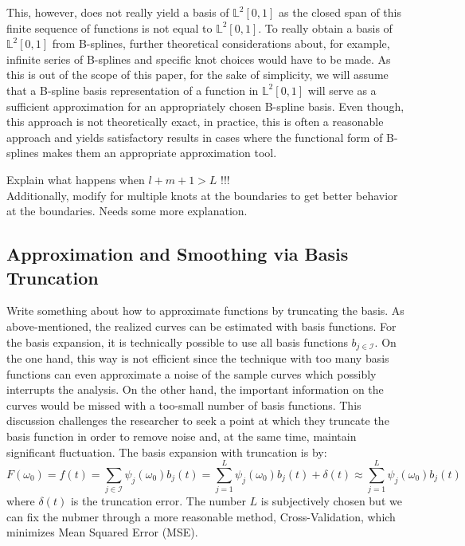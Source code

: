 \documentclass[11pt,twoside,a4paper]{article}
\begin{document}
	This, however, does not really yield a basis of $\mathbb{L}^2[0,1]$ as the closed span of this finite sequence of functions is not equal to $\mathbb{L}^2[0,1]$. To really obtain a basis of $\mathbb{L}^2[0,1]$ from B-splines, further theoretical considerations about, for example, infinite series of B-splines and specific knot choices would have to be made. As this is out of the scope of this paper, for the sake of simplicity, we will assume that a B-spline basis representation of a function in $\mathbb{L}^2[0,1]$ will serve as a sufficient approximation for an appropriately chosen B-spline basis. 
	Even though, this approach is not theoretically exact, in practice, this is often a reasonable approach and yields satisfactory results in cases where the functional form of B-splines makes them an appropriate approximation tool. 
	
	{\color{red}Explain what happens when $l+m+1 > L$ !!!\\
		Additionally, modify for multiple knots at the boundaries to get better behavior at the boundaries. Needs some more explanation.}	
	
	\subsection{Approximation and Smoothing via Basis Truncation}
	{\color{red} Write something about how to approximate functions by truncating the basis.}
	As above-mentioned, the realized curves can be estimated with basis functions. For the basis expansion, it is technically possible to use all basis functions $b_{j \in \mathcal{I}}$. On the one hand, this way is not efficient since the technique with too many basis functions can even approximate a noise of the sample curves which possibly interrupts the analysis. On the other hand, the important information on the curves would be missed with a too-small number of basis functions. This discussion challenges the researcher to seek a point at which they truncate the basis function in order to remove noise and, at the same time, maintain significant fluctuation. The basis expansion with truncation is by:
	\begin{equation}
		F(\omega_0) = f(t) = \sum_{j \in \mathcal{I}} \psi_j(\omega_0) b_j(t) = \sum_{j = 1}^{L} \psi_j(\omega_0) b_j(t) + \delta(t) \approx \sum_{j = 1}^{L} \psi_j(\omega_0) b_j(t)
	\end{equation}
	where $\delta(t)$ is the truncation error. The number $L$ is subjectively chosen but we can fix the nubmer through a more reasonable method, Cross-Validation, which minimizes Mean Squared Error (MSE). 
	
\end{document}
